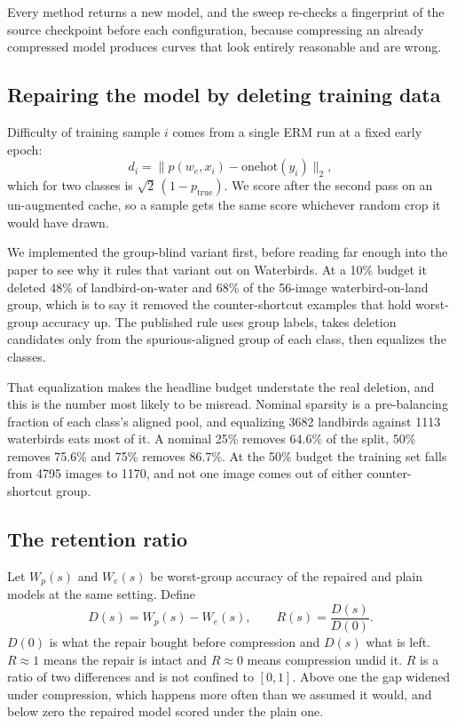 \documentclass[11pt]{article}
\begin{document}
Every method returns a new model, and the sweep re-checks a fingerprint of the
source checkpoint before each configuration, because compressing an already
compressed model produces curves that look entirely reasonable and are wrong.

\subsection{Repairing the model by deleting training data}

Difficulty of training sample $i$ comes from a single ERM run at a fixed early
epoch:
\[
d_i = \bigl\lVert p(w_e, x_i) - \mathrm{onehot}(y_i) \bigr\rVert_2 ,
\]
which for two classes is $\sqrt{2}\,(1 - p_{\text{true}})$. We score after the
second pass on an un-augmented cache, so a sample gets the same score whichever
random crop it would have drawn.

We implemented the group-blind variant first, before reading far enough into
the paper to see why it rules that variant out on Waterbirds. At a 10\% budget
it deleted 48\% of landbird-on-water and 68\% of the 56-image
waterbird-on-land group, which is to say it removed the counter-shortcut
examples that hold worst-group accuracy up. The published rule uses group
labels, takes deletion candidates only from the spurious-aligned group of each
class, then equalizes the classes.

That equalization makes the headline budget understate the real deletion, and
this is the number most likely to be misread. Nominal sparsity is a
pre-balancing fraction of each class's aligned pool, and equalizing 3682
landbirds against 1113 waterbirds eats most of it. A nominal 25\% removes
64.6\% of the split, 50\% removes 75.6\% and 75\% removes 86.7\%. At the 50\%
budget the training set falls from 4795 images to 1170, and not one image
comes out of either counter-shortcut group.

\subsection{The retention ratio}

Let $W_p(s)$ and $W_e(s)$ be worst-group accuracy of the repaired and plain
models at the same setting. Define
\[
D(s) = W_p(s) - W_e(s), \qquad R(s) = \frac{D(s)}{D(0)} .
\]
$D(0)$ is what the repair bought before compression and $D(s)$ what is left.
$R \approx 1$ means the repair is intact and $R \approx 0$ means compression
undid it. $R$ is a ratio of two differences and is not confined to $[0,1]$.
Above one the gap widened under compression, which happens more often than we
assumed it would, and below zero the repaired model scored under the plain one.
\end{document}
